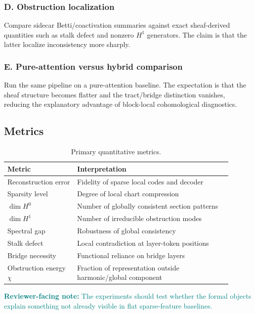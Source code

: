 \documentclass[11pt]{article}
\newcommand{\reviewer}[1]{\textcolor{teal}{\textbf{Reviewer-facing note:} #1}}
\begin{document}
\subsubsection*{D. Obstruction localization}
Compare sidecar Betti/coactivation summaries against exact sheaf-derived quantities such as stalk defect and nonzero $H^1$ generators. The claim is that the latter localize inconsistency more sharply.

\subsubsection*{E. Pure-attention versus hybrid comparison}
Run the same pipeline on a pure-attention baseline. The expectation is that the sheaf structure becomes flatter and the tract/bridge distinction vanishes, reducing the explanatory advantage of block-local cohomological diagnostics.

\subsection{Metrics}

\begin{table}[H]
\centering
\begin{tabular}{>{\raggedright\arraybackslash}p{0.28\linewidth} p{0.62\linewidth}}
\toprule
\textbf{Metric} & \textbf{Interpretation} \\
\midrule
Reconstruction error & Fidelity of sparse local codes and decoder \\
Sparsity level & Degree of local chart compression \\
$\dim H^0$ & Number of globally consistent section patterns \\
$\dim H^1$ & Number of irreducible obstruction modes \\
Spectral gap & Robustness of global consistency \\
Stalk defect & Local contradiction at layer-token positions \\
Bridge necessity & Functional reliance on bridge layers \\
Obstruction energy $\chi$ & Fraction of representation outside harmonic/global component \\
\bottomrule
\end{tabular}
\caption{Primary quantitative metrics.}
\end{table}

\reviewer{The experiments should test whether the formal objects explain something not already visible in flat sparse-feature baselines.}
\end{document}
